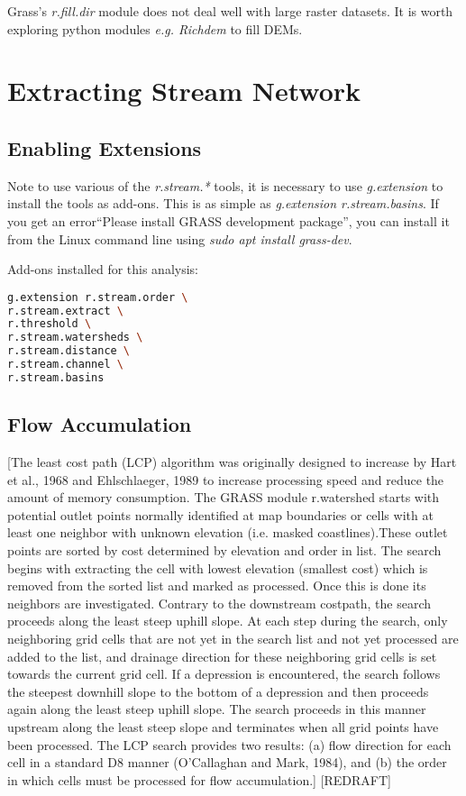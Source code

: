\noindent Grass's \emph{r.fill.dir} module does not deal well with large raster datasets. It is worth exploring python modules \emph{e.g. Richdem} to fill DEMs.

\section{Extracting Stream Network}

\subsection{Enabling Extensions}

Note to use various of the \emph{r.stream.*} tools, it is necessary to use \emph{g.extension} to install the tools as add-ons. This is as simple as \emph{g.extension r.stream.basins}. If you get an error``Please install GRASS development package”, you can install it from the Linux command line using \emph{sudo apt install grass-dev}.

Add-ons installed for this analysis:

\begin{lstlisting}[language=bash]
g.extension r.stream.order \
r.stream.extract \
r.threshold \
r.stream.watersheds \
r.stream.distance \
r.stream.channel \
r.stream.basins
\end{lstlisting}

\subsection{Flow Accumulation}

[The least cost path (LCP) algorithm was originally designed to increase by  Hart et al., 1968 and Ehlschlaeger, 1989 to increase processing speed and reduce the amount of memory consumption. The GRASS module r.watershed starts with potential outlet points normally identified at map boundaries or cells with at least one neighbor with unknown elevation (i.e. masked coastlines).These outlet points are sorted by cost determined by elevation and order in list. The search begins with extracting the cell with lowest elevation (smallest cost) which is removed from the sorted list and marked as processed. Once this is done its neighbors are investigated. Contrary to the downstream costpath, the search proceeds along the least steep uphill slope. At each step during the search, only neighboring
grid cells that are not yet in the search list and not yet processed are added to the list, and drainage direction for these neighboring grid cells is set towards the current grid cell. If a depression is encountered, the search follows the steepest downhill slope to the bottom of a depression and then proceeds again along the least steep uphill slope. The search proceeds in this manner upstream along the least steep slope and terminates when all grid points have been processed. The LCP search provides two results: (a) flow direction for each
cell in a standard D8 manner (O’Callaghan and Mark, 1984), and (b) the order in which cells must be processed for flow accumulation.] [REDRAFT]

